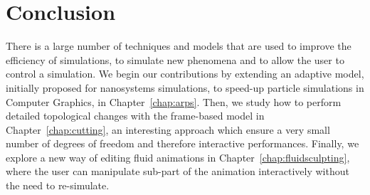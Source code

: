 \section{Conclusion}
There is a large number of techniques and models that are used to improve the efficiency of simulations, to simulate new phenomena and to allow the user to control a simulation.
We begin our contributions by extending an adaptive model, initially proposed for nanosystems simulations, to speed-up particle simulations in Computer Graphics, in Chapter~\ref{chap:arps}.
Then, we study how to perform detailed topological changes with the frame-based model in Chapter~\ref{chap:cutting}, an interesting approach which ensure a very small number of degrees of freedom and therefore interactive performances.
Finally, we explore a new way of editing fluid animations in Chapter~\ref{chap:fluidsculpting}, where the user can manipulate sub-part of the animation interactively without the need to re-simulate.
